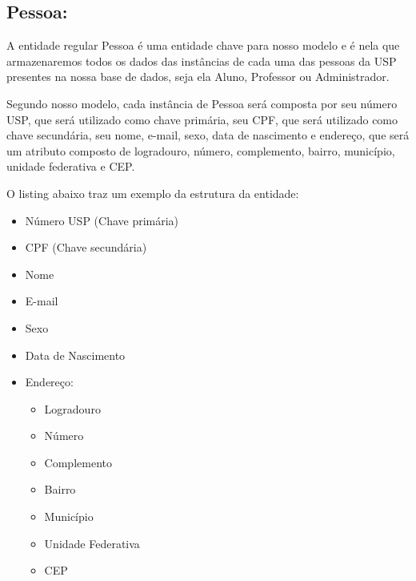 \documentclass{report}
\begin{document}
\subsection{Pessoa:}
 	A entidade regular Pessoa é uma entidade chave para nosso modelo e é nela que armazenaremos todos os dados das instâncias de cada uma das pessoas da USP presentes na nossa base de dados, seja ela Aluno, Professor ou Administrador.
	
	Segundo nosso modelo, cada instância de Pessoa será composta por seu número USP, que será utilizado como chave primária, seu CPF, que será utilizado como chave secundária, seu nome, e-mail, sexo, data de nascimento e endereço, que será um atributo composto de logradouro, número, complemento, bairro, município, unidade federativa e CEP.
	
	O listing abaixo traz um exemplo da estrutura da entidade:
\begin{itemize}
  \item Número USP  (Chave primária)
  \item CPF (Chave secundária)
  \item Nome
  \item E-mail
  \item Sexo
  \item Data de Nascimento
  \item Endereço:
  \begin{itemize}
  	\item Logradouro
  	\item Número
  	\item Complemento
  	\item Bairro
  	\item Município
  	\item Unidade Federativa
  	\item CEP
  	\end{itemize}
\end{itemize}
\end{document}
